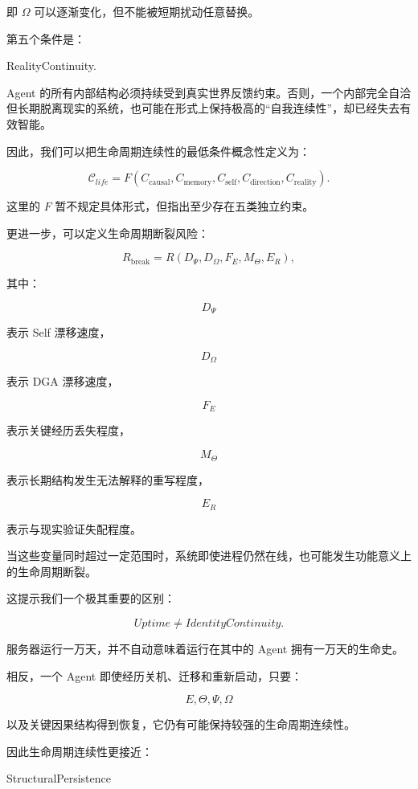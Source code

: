 即 $\Omega$ 可以逐渐变化，但不能被短期扰动任意替换。

第五个条件是：

\begin{statementbox}
RealityContinuity.
\end{statementbox}

Agent 的所有内部结构必须持续受到真实世界反馈约束。否则，一个内部完全自洽但长期脱离现实的系统，也可能在形式上保持极高的“自我连续性”，却已经失去有效智能。

因此，我们可以把生命周期连续性的最低条件概念性定义为：

\[
\mathcal{C}_{life}
=
F
\left(
C_{\mathrm{causal}},
C_{\mathrm{memory}},
C_{\mathrm{self}},
C_{\mathrm{direction}},
C_{\mathrm{reality}}
\right).
\]

这里的 $F$ 暂不规定具体形式，但指出至少存在五类独立约束。

更进一步，可以定义生命周期断裂风险：

\[
R_{\mathrm{break}}
=
R
\left(
D_\Psi,
D_\Omega,
F_E,
M_\Theta,
E_R
\right),
\]

其中：

\[
D_\Psi
\]

表示 Self 漂移速度，

\[
D_\Omega
\]

表示 DGA 漂移速度，

\[
F_E
\]

表示关键经历丢失程度，

\[
M_\Theta
\]

表示长期结构发生无法解释的重写程度，

\[
E_R
\]

表示与现实验证失配程度。

当这些变量同时超过一定范围时，系统即使进程仍然在线，也可能发生功能意义上的生命周期断裂。

这提示我们一个极其重要的区别：

\[
\boxed{
Uptime
\neq
IdentityContinuity.
}
\]

服务器运行一万天，并不自动意味着运行在其中的 Agent 拥有一万天的生命史。

相反，一个 Agent 即使经历关机、迁移和重新启动，只要：

\[
E,\Theta,\Psi,\Omega
\]

以及关键因果结构得到恢复，它仍有可能保持较强的生命周期连续性。

因此生命周期连续性更接近：

\begin{statementbox}
StructuralPersistence
\end{statementbox}

